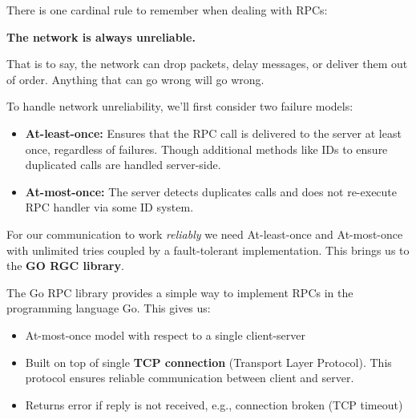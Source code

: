 \noindent
There is one cardinal rule to remember when dealing with RPCs:
\begin{theo}

    \begin{center}
        \Large{\textbf{The network is always unreliable.}}
    \end{center}

    \vspace{1em}

    \noindent
    That is to say, the network can drop packets, delay messages, or deliver them out of order. Anything that 
    can go wrong will go wrong.
\end{theo}

\noindent
To handle network unreliability, we'll first consider two failure models:

\begin{Def}

    \begin{itemize}
        \item \textbf{At-least-once:} Ensures that the RPC call is delivered to the server at least once, regardless of failures. Though additional methods like IDs to ensure duplicated calls are handled server-side.
        \item \textbf{At-most-once:} The server detects duplicates calls and does not
        re-execute RPC handler via some ID system.
    \end{itemize}
\end{Def}

\newpage

\noindent
For our communication to work \textit{reliably} we need At-least-once and At-most-once with unlimited tries coupled by 
a fault-tolerant implementation. This brings us to the \textbf{GO RGC library}.

\begin{Def}

    The Go RPC library provides a simple way to implement RPCs in the programming language Go. This gives us:
    \begin{itemize}
        \item At-most-once model with respect to a single
        client-server
        \item Built on top of single \textbf{TCP connection} (Transport Layer Protocol). This protocol ensures reliable communication between client and server.
        \item Returns error if reply is not received, e.g.,
        connection broken (TCP timeout)
    \end{itemize}
\end{Def}

